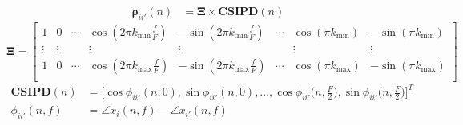 \documentclass[tikz,convert={outfile=\jobname.svg}]{standalone}
\begin{document}
\begin{align*}
    \boldsymbol{\rho}_{ii'}(n) &=  \mathbf{\Xi} \times \textbf{CSIPD}(n)
\end{align*}
\[
\mathbf{\Xi} = \begin{bmatrix}
    1 & 0 & \cdots & \cos(2\pi k_\text{min}\frac{f}{F}) & -\sin(2\pi k_\text{min}\frac{f}{F}) & \cdots & \cos(\pi k_\text{min}) & -\sin(\pi k_\text{min})\\
    \vdots & \vdots & & \vdots & \vdots & & \vdots & \vdots\\
    1 & 0 & \cdots & \cos(2\pi k_\text{max}\frac{f}{F}) & -\sin(2\pi k_\text{max}\frac{f}{F}) & \cdots &  \cos(\pi k_\text{max}) & -\sin(\pi k_\text{max})\\
\end{bmatrix}
\]
\begin{align*}
    \mathbf{CSIPD}(n) & =\biggl[\cos\phi_{ii'}(n,0), \sin\phi_{ii'}(n,0),...,\cos\phi_{ii'}\biggl(n,\frac{F}{2}\biggr), \sin\phi_{ii'}\biggl(n,\frac{F}{2}\biggr)\biggr]^T  \\
    \phi_{ii'}(n,f) &= \angle{x_i(n,f)} - \angle{x_{i'}(n,f)} 
\end{align*}
\end{document}
